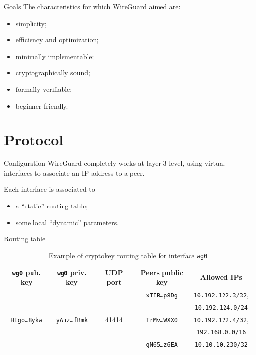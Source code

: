 \documentclass[light]{presenta}
\begin{document}
\begin{frame}{Goals}
  The characteristics for which WireGuard aimed are:
  \begin{itemize}
    \item simplicity;
    \pause
    \item efficiency and optimization;
    \pause
    \item minimally implementable; %
    \pause
    \item cryptographically sound;
    \pause
    \item formally verifiable;
    \pause
    \item beginner-friendly.
  \end{itemize}
\end{frame}

\section{Protocol}

\begin{frame}{Configuration}
  WireGuard completely works at layer 3 level, using virtual interfaces to associate an IP address to a peer.

  \bigskip
  Each interface is associated to:
  \begin{itemize}
    \item a ``static'' routing table;
    \item some local ``dynamic'' parameters.
  \end{itemize}
\end{frame}

\begin{frame}{Routing table}
  \begin{table}[H]
    \centering
    \caption{Example of cryptokey routing table for interface \texttt{wg0}}
    \label{table:routing}
    \begin{tabular}{|cc|c|cc|}
      \hline
      \textbf{\texttt{wg0} pub. key} & \textbf{\texttt{wg0} priv. key} & \textbf{UDP port} & \textbf{Peers public key} & \textbf{Allowed IPs} \\
      \hline
      & & & \texttt{xTIB\dots p8Dg} & \texttt{10.192.122.3/32}, \\
      & & & & \texttt{10.192.124.0/24} \\
      \texttt{HIgo\dots 8ykw} & \texttt{yAnz\dots fBmk} & 41414 & \texttt{TrMv\dots WXX0} & \texttt{10.192.122.4/32}, \\
      & & & & \texttt{192.168.0.0/16} \\
      & & & \texttt{gN65\dots z6EA} & \texttt{10.10.10.230/32} \\
      \hline
    \end{tabular}
  \end{table}
\end{frame}
\end{document}
